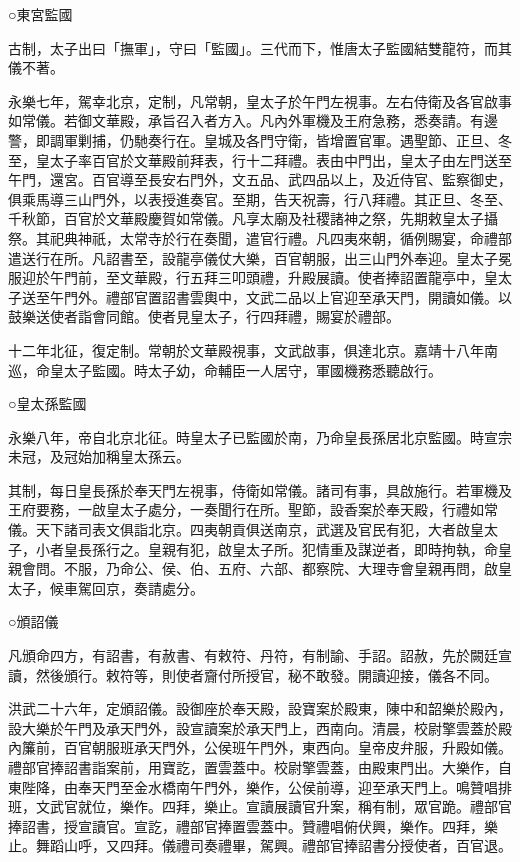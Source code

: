 ○東宮監國

古制，太子出曰「撫軍」，守曰「監國」。三代而下，惟唐太子監國結雙龍符，而其儀不著。

永樂七年，駕幸北京，定制，凡常朝，皇太子於午門左視事。左右侍衛及各官啟事如常儀。若御文華殿，承旨召入者方入。凡內外軍機及王府急務，悉奏請。有邊警，即調軍剿捕，仍馳奏行在。皇城及各門守衛，皆增置官軍。遇聖節、正旦、冬至，皇太子率百官於文華殿前拜表，行十二拜禮。表由中門出，皇太子由左門送至午門，還宮。百官導至長安右門外，文五品、武四品以上，及近侍官、監察御史，俱乘馬導三山門外，以表授進奏官。至期，告天祝壽，行八拜禮。其正旦、冬至、千秋節，百官於文華殿慶賀如常儀。凡享太廟及社稷諸神之祭，先期敕皇太子攝祭。其祀典神祇，太常寺於行在奏聞，遣官行禮。凡四夷來朝，循例賜宴，命禮部遣送行在所。凡詔書至，設龍亭儀仗大樂，百官朝服，出三山門外奉迎。皇太子冕服迎於午門前，至文華殿，行五拜三叩頭禮，升殿展讀。使者捧詔置龍亭中，皇太子送至午門外。禮部官置詔書雲輿中，文武二品以上官迎至承天門，開讀如儀。以鼓樂送使者詣會同館。使者見皇太子，行四拜禮，賜宴於禮部。

十二年北征，復定制。常朝於文華殿視事，文武啟事，俱達北京。嘉靖十八年南巡，命皇太子監國。時太子幼，命輔臣一人居守，軍國機務悉聽啟行。

○皇太孫監國

永樂八年，帝自北京北征。時皇太子已監國於南，乃命皇長孫居北京監國。時宣宗未冠，及冠始加稱皇太孫云。

其制，每日皇長孫於奉天門左視事，侍衛如常儀。諸司有事，具啟施行。若軍機及王府要務，一啟皇太子處分，一奏聞行在所。聖節，設香案於奉天殿，行禮如常儀。天下諸司表文俱詣北京。四夷朝貢俱送南京，武選及官民有犯，大者啟皇太子，小者皇長孫行之。皇親有犯，啟皇太子所。犯情重及謀逆者，即時拘執，命皇親會問。不服，乃命公、侯、伯、五府、六部、都察院、大理寺會皇親再問，啟皇太子，候車駕回京，奏請處分。

○頒詔儀

凡頒命四方，有詔書，有赦書、有敕符、丹符，有制諭、手詔。詔赦，先於闕廷宣讀，然後頒行。敕符等，則使者齎付所授官，秘不敢發。開讀迎接，儀各不同。

洪武二十六年，定頒詔儀。設御座於奉天殿，設寶案於殿東，陳中和韶樂於殿內，設大樂於午門及承天門外，設宣讀案於承天門上，西南向。清晨，校尉擎雲蓋於殿內簾前，百官朝服班承天門外，公侯班午門外，東西向。皇帝皮弁服，升殿如儀。禮部官捧詔書詣案前，用寶訖，置雲蓋中。校尉擎雲蓋，由殿東門出。大樂作，自東陛降，由奉天門至金水橋南午門外，樂作，公侯前導，迎至承天門上。鳴贊唱排班，文武官就位，樂作。四拜，樂止。宣讀展讀官升案，稱有制，眾官跪。禮部官捧詔書，授宣讀官。宣訖，禮部官捧置雲蓋中。贊禮唱俯伏興，樂作。四拜，樂止。舞蹈山呼，又四拜。儀禮司奏禮畢，駕興。禮部官捧詔書分授使者，百官退。

